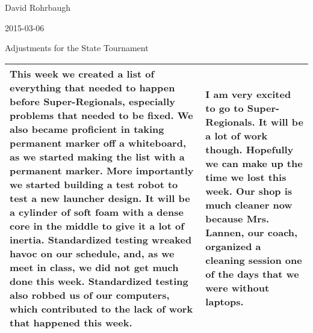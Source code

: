 David Rohrbaugh

2015-03-06

Adjustments for the State Tournament

\begin{tabular}{|p{5cm}|p{5cm}|}
 \hline
 This week we created a list of everything that needed to happen before Super-Regionals, especially problems that needed to be fixed. We also became proficient in taking permanent marker off a whiteboard, as we started making the list with a permanent marker. More importantly we started building a test robot to test a new launcher design. It will be a cylinder of soft foam with a dense core in the middle to give it a lot of inertia. Standardized testing wreaked havoc on our schedule, and, as we meet in class, we did not get much done this week. Standardized testing also robbed us of our computers, which contributed to the lack of work that happened this week.&
 I am very excited to go to Super-Regionals. It will be a lot of work though. Hopefully we can make up the time we lost this week. Our shop is much cleaner now because Mrs. Lannen, our coach, organized a cleaning session one of the days that we were without laptops.\\
 \hline
\end{tabular}


